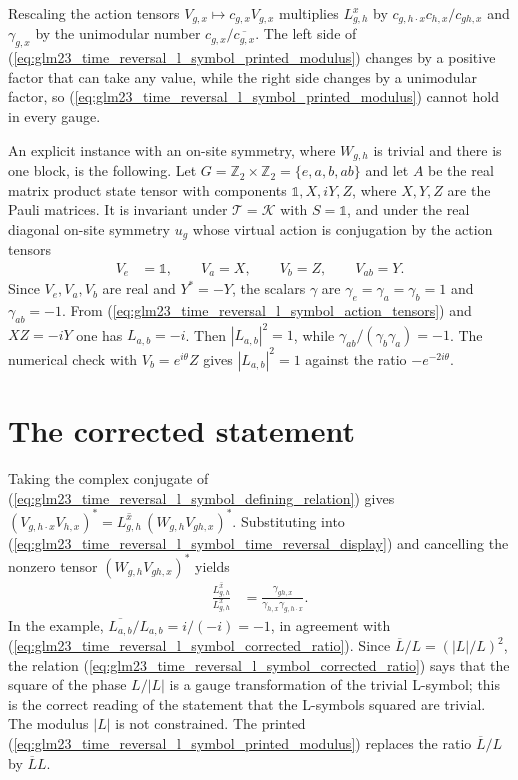 \documentclass{article}
\begin{document}
Rescaling the action tensors $V_{g,x}\mapsto c_{g,x}V_{g,x}$ multiplies
$L^x_{g,h}$ by $c_{g,h\cdot x}c_{h,x}/c_{gh,x}$ and $\gamma_{g,x}$ by the
unimodular number $c_{g,x}/\overline{c_{g,x}}$. The left side of
(\ref{eq:glm23_time_reversal_l_symbol_printed_modulus}) changes by a positive factor that can take any value,
while the right side changes by a unimodular factor, so (\ref{eq:glm23_time_reversal_l_symbol_printed_modulus})
cannot hold in every gauge.

An explicit instance with an on-site symmetry, where $W_{g,h}$ is trivial
and there is one block, is the following. Let $G=\mathbb Z_2\times\mathbb
Z_2=\{e,a,b,ab\}$ and let $A$ be the real matrix product state tensor with
components $\mathbb 1,X,iY,Z$, where $X,Y,Z$ are the Pauli matrices. It is
invariant under $\mathcal T=\mathcal K$ with $S=\mathbb 1$, and under the
real diagonal on-site symmetry $u_g$ whose virtual action is conjugation by
the action tensors
\begin{align}
  V_e &= \mathbb 1,\qquad V_a=X,\qquad V_b=Z,\qquad V_{ab}=Y .
  \label{eq:glm23_time_reversal_l_symbol_action_tensors}
\end{align}
Since $V_e,V_a,V_b$ are real and $Y^*=-Y$, the scalars $\gamma$ are
$\gamma_e=\gamma_a=\gamma_b=1$ and $\gamma_{ab}=-1$. From
(\ref{eq:glm23_time_reversal_l_symbol_action_tensors}) and $XZ=-iY$ one has
$L_{a,b}=-i$. Then $|L_{a,b}|^2=1$, while
$\gamma_{ab}/(\gamma_b\gamma_a)=-1$. The numerical check with
$V_b=e^{i\theta}Z$ gives $|L_{a,b}|^2=1$ against the ratio
$-e^{-2i\theta}$.

\section{The corrected statement}

Taking the complex conjugate of (\ref{eq:glm23_time_reversal_l_symbol_defining_relation}) gives
$(V_{g,h\cdot x}V_{h,x})^*=\overline{L^x_{g,h}}\,(W_{g,h}V_{gh,x})^*$.
Substituting into (\ref{eq:glm23_time_reversal_l_symbol_time_reversal_display}) and cancelling the nonzero tensor
$(W_{g,h}V_{gh,x})^*$ yields
\begin{align}
  \frac{\overline{L^x_{g,h}}}{L^x_{g,h}}
   & =\frac{\gamma_{gh,x}}{\gamma_{h,x}\gamma_{g,h\cdot x}} .
  \label{eq:glm23_time_reversal_l_symbol_corrected_ratio}
\end{align}
In the example, $\overline{L_{a,b}}/L_{a,b}=i/(-i)=-1$, in agreement with
(\ref{eq:glm23_time_reversal_l_symbol_corrected_ratio}). Since $\overline L/L=(|L|/L)^2$, the relation
(\ref{eq:glm23_time_reversal_l_symbol_corrected_ratio}) says that the square of the phase $L/|L|$ is a gauge
transformation of the trivial L-symbol; this is the correct reading of the
statement that the L-symbols squared are trivial. The modulus $|L|$ is not
constrained. The printed (\ref{eq:glm23_time_reversal_l_symbol_printed_modulus}) replaces the ratio
$\overline L/L$ by $\overline LL$.
\end{document}
